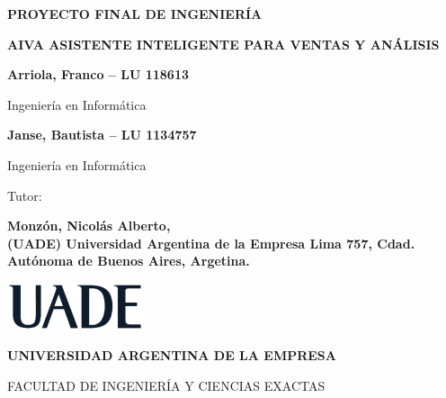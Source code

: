\begin{titlepage}
    \centering

    {\textbf{\fontsize{18}{20}\selectfont PROYECTO FINAL DE INGENIERÍA} \par}
    \vspace{1.5cm}

    {\textbf{\fontsize{16}{18}\selectfont AIVA ASISTENTE INTELIGENTE PARA VENTAS Y ANÁLISIS} \par}
    \vspace{0.5cm}

    {\textbf{\fontsize{14}{16}\selectfont Arriola, Franco -- LU 118613} \par}
    {\fontsize{14}{16}\selectfont Ingeniería en Informática \par}
    \vspace{1cm}

    {\textbf{\fontsize{14}{16}\selectfont Janse, Bautista -- LU 1134757} \par}
    {\fontsize{14}{16}\selectfont Ingeniería en Informática \par}
    \vspace{1.5cm}

    {\fontsize{14}{16}\selectfont Tutor: \par}
    {\textbf{\fontsize{14}{16}\selectfont Monzón, Nicolás Alberto,
		\\ (UADE) Universidad Argentina de la Empresa Lima 757, Cdad. Autónoma de Buenos Aires, Argetina.
			} \par}
    \vspace{3cm}

	{\textbf{\fontsize{14}{16}\selectfont \the\year} \par}
    \vspace{2cm}

    \includegraphics[width=0.30\textwidth]{./images/UADE}\par \vspace{1cm}
    {\textbf{\fontsize{14}{16}\selectfont UNIVERSIDAD ARGENTINA DE LA EMPRESA} \par}
    {\fontsize{14}{16}\selectfont FACULTAD DE INGENIERÍA Y CIENCIAS EXACTAS \par}
\end{titlepage}